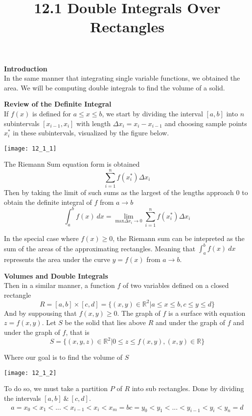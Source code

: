 \documentclass{article}
\title{12.1 Double Integrals Over Rectangles}
\begin{document}
  \maketitle
  \textbf{Introduction}\\
  In the same manner that integrating single variable functions, we obtained the area. We will be computing double integrals to find the volume of a solid.

  \textbf{Review of the Definite Integral}\\
  If $ f(x) $ is defined for $ a \le x\le b $, we start by dividing the interval $ [a,b] $ into $ n $ subintervals $ [x_{i-1},x_{i} ] $ with length $ \Delta x_{i}=x_{i}-x_{i-1} $ and choosing sample points $ x_{i}^{*} $ in these subintervals, visualized by the figure below.
  \begin{center}
    \texttt{[image: 12\_1\_1]}
  \end{center}

  The Riemann Sum equation form is obtained
  \[
   \sum^{n}_{i=1} f(x_{i}^{*}) \Delta x_{i} 
  \]
  Then by taking the limit of such sums as the largest of the lengths approach 0 to obtain the definite integral of $ f $ from $ a \to b $
  \[
    \int^{b}_{a} f(x)~dx=\lim_{\text{max}\Delta x_{i} \to 0} \sum^{n}_{i=1} f(x_{i}^{*})\Delta x_{i}
  \]

  In the special case where $ f(x) \ge 0$, the Riemann sum can be intepreted as the sum of the areas of the approximating rectangles. Meaning that $ \int^{b}_{a} f(x)~dx $ represents the area under the curve $ y=f(x) $ from $ a\to b $. 

  \textbf{Volumes and Double Integrals}\\
  Then in a similar manner, a function $ f $ of two variables defined on a closed rectangle
  \[
    R=[a,b] \times [c,d] = \{ (x,y) \in \mathbb{R}^{2} | a \le x \le b,c \le y \le d \}
  \]
  And by suppousing that $ f(x,y) \ge 0 $. The graph of $ f $ is a surface with equation $ z=f(x,y) $. Let $ S $ be the solid that lies above $ R $ and  under the graph of $ f $ and under the graph of $ f $, that is
  \[
    S=\{ (x,y,z) \in \mathbb{R}^{2} | 0 \le z \le f(x,y), (x,y) \in \mathbb{R} \}
  \]
  
  Where our goal is to find the volume of $ S $
  \begin{center}
    \texttt{[image: 12\_1\_2]}
  \end{center}

  To do so, we must take a partition $ P $ of $ R $ into sub rectangles. Done by dividing the intervals $ [a,b] ~\&~ [c,d] $.
  \[
    \begin{gathered}
    a = x_0 < x_1 < ... < x_{i-1} < x_i < x_{m} = b
    c = y_0 < y_1 < ... < y_{i-1} < y_i < y_{n} = d
    \end{gathered}
  \]
\end{document}
